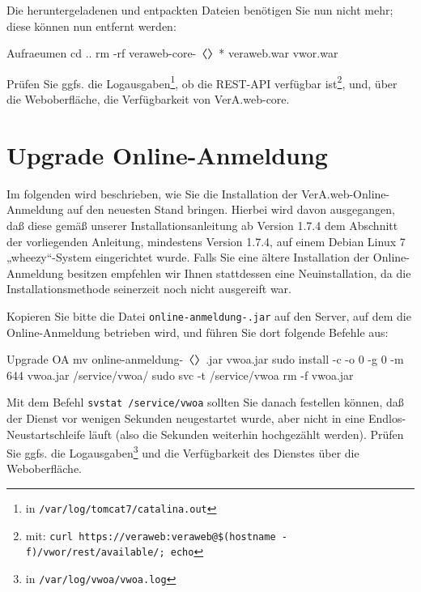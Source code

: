 \begin{minipage}{\textwidth}
Die heruntergeladenen und entpackten Dateien benötigen Sie nun nicht
mehr; diese können nun entfernt werden:

\begin{lstdump}{Aufraeumen}
cd ..
rm -rf veraweb-core-〈\lstdumpesc{\vwiaverssw}〉* veraweb.war vwor.war
\end{lstdump}
\end{minipage}

Prüfen Sie ggfs. die Logausgaben\Hair\footnote{\label{fn:tomcatlogs}in
\texttt{/var/log/tomcat7/catalina.out}}, ob die REST-API verfügbar
ist\Hair\footnote{\label{fn:vworcheck}mit:
\texttt{curl https://veraweb:veraweb@\$(hostname -f)/vwor/rest/available/; echo}%
}, und, über die Weboberfläche, die Verfügbarkeit von VerA.web-core.

\ifoa

\section{Upgrade Online-Anmeldung}\label{sec:upgrade-oa}

Im folgenden wird beschrieben, wie Sie die Installation der
VerA.web-Online-Anmeldung auf den neuesten Stand bringen.
Hierbei wird davon ausgegangen, daß diese gemäß
 \ifupgradeanleitung
  unserer Installationsanleitung ab Version 1.7.4
 \else%
  dem Abschnitt  der vorliegenden Anleitung,
  mindestens Version 1.7.4,
 \fi%
auf einem Debian Linux 7 „wheezy“-System eingerichtet wurde.
Falls Sie eine ältere Installation der Online-Anmeldung besitzen
empfehlen wir Ihnen stattdessen eine Neuinstallation, da die
Installationsmethode seinerzeit noch nicht ausgereift war.

\begin{minipage}{\textwidth}
Kopieren Sie bitte die Datei \texttt{online-anmeldung-\vwiaverssw{}.jar}
auf den Server, auf dem die Online-Anmeldung betrieben wird, und führen
Sie dort folgende Befehle aus:

\begin{lstdump}{Upgrade OA}
mv online-anmeldung-〈\lstdumpesc{\vwiaverssw}〉.jar vwoa.jar
sudo install -c -o 0 -g 0 -m 644 vwoa.jar /service/vwoa/
sudo svc -t /service/vwoa
rm -f vwoa.jar
\end{lstdump}
\end{minipage}

Mit dem Befehl \texttt{svstat /service/vwoa} sollten Sie danach
festellen können, daß der Dienst vor wenigen Sekunden neugestartet
wurde, aber nicht in eine Endlos-Neustartschleife läuft (also
die Sekunden weiterhin hochgezählt werden). Prüfen Sie ggfs. die
Logausgaben\Hair\footnote{in \texttt{/var/log/vwoa/vwoa.log}}
und die Verfügbarkeit des Dienstes über die Weboberfläche.

